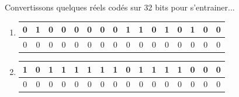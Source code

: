 \documentclass[12pt]{article}
\newenvironment{alphenum}
{\begin{enumerate}[label=\alph*.]}
	{\end{enumerate}}
\begin{document}
		\begin{MonExo}
		Convertissons quelques réels codés sur 32 bits pour s'entrainer...
		\begin{alphenum}
			\item
				\begin{tabular}{|c|c|c|c|c|c|c|c|c|c|c|c|c|c|c|c|} %
					\hline
					0&1&0&0&0&0&0&0&1&1&0&1&0&1&0&0 \\
					\hline
					0&0&0&0&0&0&0&0&0&0&0&0&0&0&0&0 \\
					\hline
				\end{tabular}
			\item
				\begin{tabular}{|c|c|c|c|c|c|c|c|c|c|c|c|c|c|c|c|} %
					\hline
					1&0&1&1&1&1&1&1&0&1&1&1&1&0&0&0 \\
					\hline
					0&0&0&0&0&0&0&0&0&0&0&0&0&0&0&0 \\
					\hline
				\end{tabular}
		\end{alphenum}
	\end{MonExo}
\end{document}
